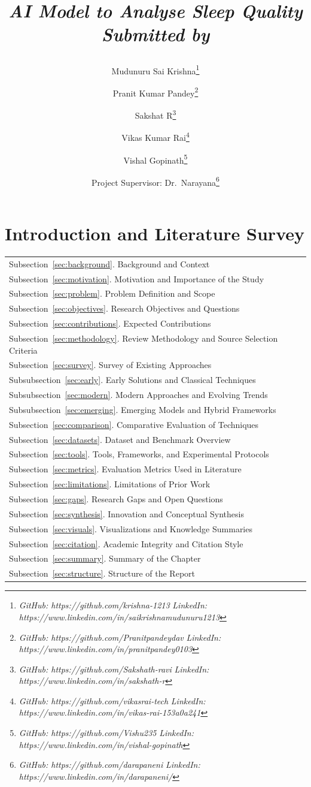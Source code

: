 \documentclass[10pt]{article}
\title{%
  \begin{center}
    {\Huge \textit{AI Model to Analyse Sleep Quality}}\\[6pt]
    {\large \textit{Submitted by}}
  \end{center}%
}
\author{Mudunuru Sai Krishna\footnote{%
  \email{Email: srkr1213@gmail.com}
  {\textit{GitHub: https://github.com/krishna-1213}}
  {\textit{LinkedIn: https://www.linkedin.com/in/saikrishnamudunuru1213}}}}
\author{Pranit Kumar Pandey\footnote{%
  \email{Email: pranitpandey.dav@gmail.com}
  {\textit{GitHub: https://github.com/Pranitpandeydav}}
  {\textit{LinkedIn: https://www.linkedin.com/in/pranitpandey0103}}}}
\author{Sakshat R\footnote{%
  \email{Email: sakshat.ravi@gmail.com}
  {\textit{GitHub: https://github.com/Sakshath-ravi}}
  {\textit{LinkedIn: https://www.linkedin.com/in/sakshath-r}}}}
\author{Vikas Kumar Rai\footnote{%
  \email{Email: vikasrai2231@gmail.com}
  {\textit{GitHub: https://github.com/vikasrai-tech}}
  {\textit{LinkedIn: https://www.linkedin.com/in/vikas-rai-153a0a241}}}}
\author{Vishal Gopinath\footnote{%
  \email{Email: vishal.bglr@gmail.com}
  {\textit{GitHub: https://github.com/Vishu235}}
  {\textit{LinkedIn: https://www.linkedin.com/in/vishal-gopinath}}}}
\author{Project Supervisor: Dr.~Narayana\footnote{%
  \email{Email: darapaneni@gmail.com}
  {\textit{GitHub: https://github.com/darapaneni}}
  {\textit{LinkedIn: https://www.linkedin.com/in/darapaneni/}}}}
\begin{document}
\maketitle
\flushbottom
\newpage
\pagestyle{fancynotes}

\section{Introduction and Literature Survey}
\label{sec:intro}

\begin{margintable}\vspace{1.4in}\footnotesize
\begin{tabularx}{\marginparwidth}{|X}
  Subsection~\ref{sec:background}. Background and Context\\
  Subsection~\ref{sec:motivation}. Motivation and Importance of the Study\\
  Subsection~\ref{sec:problem}. Problem Definition and Scope\\
  Subsection~\ref{sec:objectives}. Research Objectives and Questions\\
  Subsection~\ref{sec:contributions}. Expected Contributions\\
  Subsection~\ref{sec:methodology}. Review Methodology and Source Selection Criteria\\
  Subsection~\ref{sec:survey}. Survey of Existing Approaches\\
  Subsubsection~\ref{sec:early}. Early Solutions and Classical Techniques\\
  Subsubsection~\ref{sec:modern}. Modern Approaches and Evolving Trends\\
  Subsubsection~\ref{sec:emerging}. Emerging Models and Hybrid Frameworks\\
  Subsection~\ref{sec:comparison}. Comparative Evaluation of Techniques\\
  Subsection~\ref{sec:datasets}. Dataset and Benchmark Overview\\
  Subsection~\ref{sec:tools}. Tools, Frameworks, and Experimental Protocols\\
  Subsection~\ref{sec:metrics}. Evaluation Metrics Used in Literature\\
  Subsection~\ref{sec:limitations}. Limitations of Prior Work\\
  Subsection~\ref{sec:gaps}. Research Gaps and Open Questions\\
  Subsection~\ref{sec:synthesis}. Innovation and Conceptual Synthesis\\
  Subsection~\ref{sec:visuals}. Visualizations and Knowledge Summaries\\
  Subsection~\ref{sec:citation}. Academic Integrity and Citation Style\\
  Subsection~\ref{sec:summary}. Summary of the Chapter\\
  Subsection~\ref{sec:structure}. Structure of the Report\\
\end{tabularx}
\end{margintable}
\end{document}
